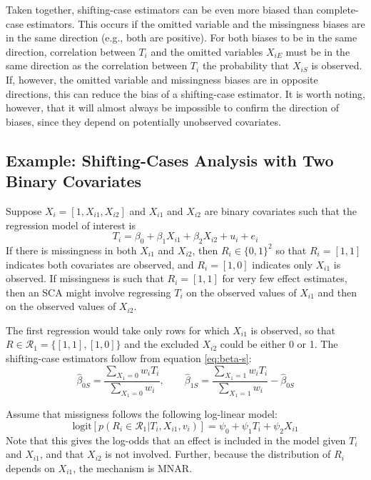 \documentclass[
]{article}
\begin{document}
Taken together, shifting-case estimators can be even more biased than complete-case estimators.
This occurs if the omitted variable and the missingness biases are in the same direction (e.g., both are positive).
For both biases to be in the same direction, correlation between \(T_i\) and the omitted variables \(X_{iE}\) must be in the same direction as the correlation between \(T_i\) the probability that \(X_{iS}\) is observed.
If, however, the omitted variable and missingness biases are in opposite directions, this can reduce the bias of a shifting-case estimator.
It is worth noting, however, that it will almost always be impossible to confirm the direction of biases, since they depend on potentially unobserved covariates.

\hypertarget{example-shifting-cases-analysis-with-two-binary-covariates}{%
\subsection{Example: Shifting-Cases Analysis with Two Binary Covariates}\label{example-shifting-cases-analysis-with-two-binary-covariates}}

Suppose \(X_i = [1, X_{i1}, X_{i2}]\) and \(X_{i1}\) and \(X_{i2}\) are binary covariates such that the regression model of interest is
\begin{equation}
T_i = \beta_0 + \beta_1 X_{i1} + \beta_2 X_{i2} + u_i + e_i
\label{eq:sca-ex}
\end{equation}
If there is missingness in both \(X_{i1}\) and \(X_{i2}\), then \(R_i \in \{0, 1\}^2\) so that \(R_i = [1,1]\) indicates both covariates are observed, and \(R_i = [1, 0]\) indicates only \(X_{i1}\) is observed.
If missingness is such that \(R_i = [1, 1]\) for very few effect estimates, then an SCA might involve regressing \(T_i\) on the observed values of \(X_{i1}\) and then on the observed values of \(X_{i2}\).

The first regression would take only rows for which \(X_{i1}\) is observed, so that \(R \in \mathcal{R}_{1} = \{[1,1], [1,0]\}\) and the excluded \(X_{i2}\) could be either 0 or 1.
The shifting-case estimators follow from equation \eqref{eq:beta-s}:
\[
\hat{\beta}_{0S} = \frac{\sum_{X_1 = 0} w_i T_i}{\sum_{X_1 = 0} w_i}, 
\qquad \hat{\beta}_{1S} = \frac{\sum_{X_1 = 1} w_i T_i}{\sum_{X_1 = 1} w_i} - \hat{\beta}_{0S}
\]

Assume that missigness follows the following log-linear model:
\begin{equation}
\text{logit}[p(R_i \in \mathcal{R}_{1} | T_i, X_{i1}, v_i)] = \psi_{0} + \psi_{1} T_i + \psi_{2} X_{i1} 
\label{eq:logit-sca}
\end{equation}
Note that this gives the log-odds that an effect is included in the model given \(T_i\) and \(X_{i1}\), and that \(X_{i2}\) is not involved.
Further, because the distribution of \(R_i\) depends on \(X_{i1}\), the mechanism is MNAR.
\end{document}
